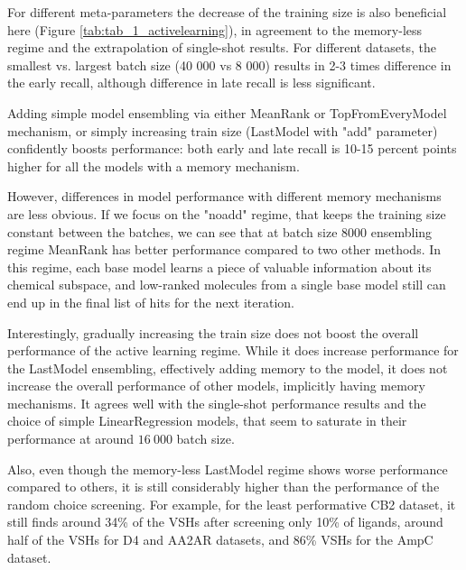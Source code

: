 For different meta-parameters the decrease of the training size is also beneficial here (Figure \ref{tab:tab_1_activelearning}), in agreement to the memory-less regime and the extrapolation of single-shot results. For different datasets, the smallest vs. largest batch size (40 000 vs 8 000) results in 2-3 times difference in the early recall, although difference in late recall is less significant.

Adding simple model ensembling via either MeanRank or TopFromEveryModel mechanism, or simply increasing train size (LastModel with "add" parameter) confidently boosts performance: both early and late recall is 10-15 percent points higher for all the models with a memory mechanism.

However, differences in model performance with different memory mechanisms are less obvious. If we focus on the "noadd" regime, that keeps the training size constant between the batches, we can see that at batch size 8000  ensembling regime MeanRank has better performance compared to two other methods. In this regime, each base model learns a piece of valuable information about its chemical subspace, and low-ranked molecules from a single base model still can end up in the final list of hits for the next iteration.

Interestingly, gradually increasing the train size does not boost the overall performance of the active learning regime. While it does increase performance for the LastModel ensembling, effectively adding memory to the model, it does not increase the overall performance of other models, implicitly having memory mechanisms. It agrees well with the single-shot performance results and the choice of simple LinearRegression models, that seem to saturate in their performance at around $16\ 000$ batch size.

Also, even though the memory-less LastModel regime shows worse performance compared to others, it is still considerably higher than the performance of the random choice screening. For example, for the least performative CB2 dataset, it still finds around 34\% of the VSHs after screening only 10\% of ligands, around half of the VSHs for D4 and AA2AR datasets, and 86\% VSHs for the AmpC dataset.
